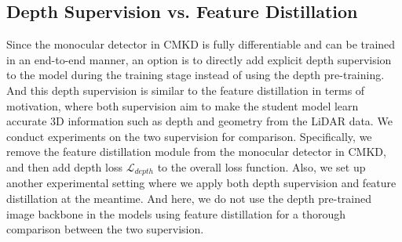 \documentclass[runningheads]{llncs}
\begin{document}
\subsection{Depth Supervision vs. Feature Distillation}
Since the monocular detector in CMKD is fully differentiable and can be trained in an end-to-end manner, an option is to directly add explicit depth supervision to the model during the training stage instead of using the depth pre-training.
And this depth supervision is similar to the feature distillation in terms of motivation, where both supervision aim to make the student model learn accurate 3D information such as depth and geometry from the LiDAR data.
We conduct experiments on the two supervision for comparison.
Specifically, we remove the feature distillation module from the monocular detector in CMKD, and then add depth loss $\mathcal{L}_{depth}$ to the overall loss function. 
Also, we set up another experimental setting where we apply both depth supervision and feature distillation at the meantime.
And here, we do not use the depth pre-trained image backbone in the models using feature distillation for a thorough comparison between the two supervision.

\begin{table}[t]
    \small
    \centering
        \caption{Comparison between depth supervision and feature distillation.
        $Depth$ denotes using depth supervision. 
        $Feat.$ denotes using feature distillation.
        The results differ when using training sets with different amounts of training samples.}
    \label{tab:abl depth vs feat}
\end{table}
\end{document}
